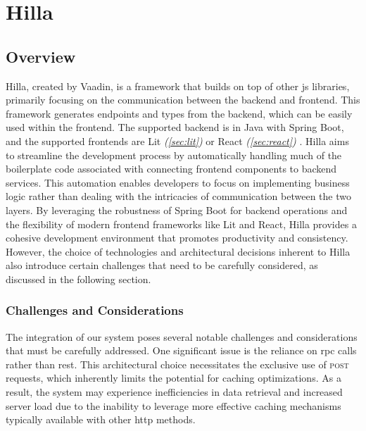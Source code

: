 \section{Hilla}
\label{sec:hilla}

\subsection{Overview}
\label{subsec:hilla:overview}

Hilla, created by Vaadin, is a framework that builds on top of other \acrshort{js} libraries, primarily focusing on the communication between the backend and frontend. This framework generates endpoints and types from the backend, which can be easily used within the frontend. The supported backend is in Java with Spring Boot, and the supported frontends are Lit \textit{(\ref{sec:lit})} \cite{hilla:lit} or React \textit{(\ref{sec:react})} \cite{hilla:react}. Hilla aims to streamline the development process by automatically handling much of the boilerplate code associated with connecting frontend components to backend services. This automation enables developers to focus on implementing business logic rather than dealing with the intricacies of communication between the two layers. By leveraging the robustness of Spring Boot for backend operations and the flexibility of modern frontend frameworks like Lit and React, Hilla provides a cohesive development environment that promotes productivity and consistency. However, the choice of technologies and architectural decisions inherent to Hilla also introduce certain challenges that need to be carefully considered, as discussed in the following section.

\subsubsection{Challenges and Considerations}
\label{subsec:hilla:challenges}

The integration of our system poses several notable challenges and considerations that must be carefully addressed. One significant issue is the reliance on \acrshort{rpc} calls rather than \acrshort{rest}. This architectural choice necessitates the exclusive use of \textsc{post} requests, which inherently limits the potential for caching optimizations. As a result, the system may experience inefficiencies in data retrieval and increased server load due to the inability to leverage more effective caching mechanisms typically available with other \acrshort{http} methods.

